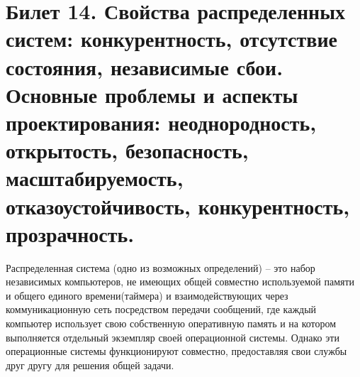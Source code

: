 \newpage
\section{Билет 14. Свойства распределенных систем: конкурентность, отсутствие состояния, независимые сбои. Основные проблемы и аспекты проектирования: неоднородность, открытость, безопасность, масштабируемость, отказоустойчивость, конкурентность, прозрачность.}

Распределенная  система (одно из возможных определений) – это набор  независимых  компьютеров,  не имеющих общей совместно используемой памяти и общего единого времени(таймера) и взаимодействующих через коммуникационную сеть  посредством  передачи  сообщений,  где  каждый  компьютер использует  свою  собственную  оперативную  память  и  на  котором выполняется  отдельный  экземпляр  своей  операционной  системы. Однако  эти  операционные  системы  функционируют  совместно, предоставляя свои службы друг другу для решения общей задачи.

